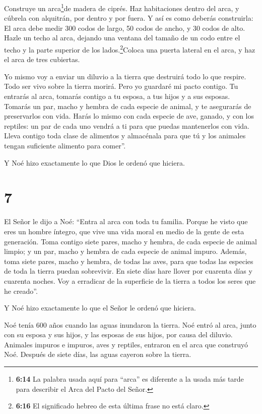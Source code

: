  Construye un arca\footnote{\textbf{6:14} La palabra usada
  aquí para ``arca'' es diferente a la usada más tarde para describir el
  Arca del Pacto del Señor.}de madera de ciprés. Haz habitaciones dentro
del arca, y cúbrela con alquitrán, por dentro y por fuera. 
Y así es como deberás construirla: El arca debe medir 300 codos de
largo, 50 codos de ancho, y 30 codos de alto.  Hazle un
techo al arca, dejando una ventana del tamaño de un codo entre el techo
y la parte superior de los lados.\footnote{\textbf{6:16} El significado
  hebreo de esta última frase no está claro.}Coloca una puerta lateral
en el arca, y haz el arca de tres cubiertas.

 Yo mismo voy a enviar un diluvio a la tierra que destruirá
todo lo que respire. Todo ser vivo sobre la tierra morirá. 
Pero yo guardaré mi pacto contigo. Tu entrarás al arca, tomarás contigo
a tu esposa, a tus hijos y a sus esposas.  Tomarás un par,
macho y hembra de cada especie de animal, y te asegurarás de
preservarlos con vida.  Harás lo mismo con cada especie de
ave, ganado, y con los reptiles: un par de cada uno vendrá a ti para que
puedas mantenerlos con vida.  Lleva contigo toda clase de
alimentos y almacénala para que tú y los animales tengan suficiente
alimento para comer''.

 Y Noé hizo exactamente lo que Dios le ordenó que hiciera.

\hypertarget{section-6}{%
\section{7}\label{section-6}}

 El Señor le dijo a Noé: ``Entra al arca con toda tu
familia. Porque he visto que eres un hombre íntegro, que vive una vida
moral en medio de la gente de esta generación.  Toma contigo
siete pares, macho y hembra, de cada especie de animal limpio; y un par,
macho y hembra de cada especie de animal impuro.  Además,
toma siete pares, macho y hembra, de todas las aves, para que todas las
especies de toda la tierra puedan sobrevivir.  En siete días
hare llover por cuarenta días y cuarenta noches. Voy a erradicar de la
superficie de la tierra a todos los seres que he creado''.

 Y Noé hizo exactamente lo que el Señor le ordenó que
hiciera.

 Noé tenía 600 años cuando las aguas inundaron la tierra.
 Noé entró al arca, junto con su esposa y sus hijos, y las
esposas de sus hijos, por causa del diluvio.  Animales
impuros e impuros, aves y reptiles,  entraron en el arca que
construyó Noé.  Después de siete días, las aguas cayeron
sobre la tierra.

